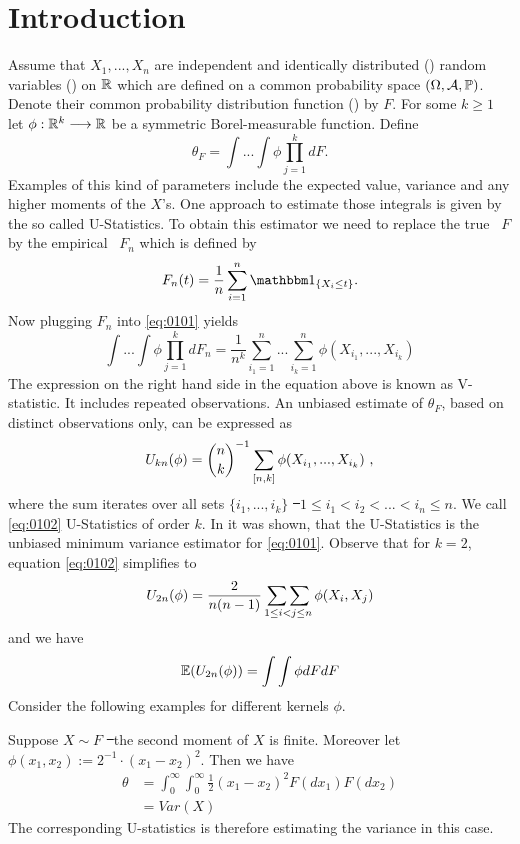 \chapter{Introduction} \label{ch:introduction}
\label{sec:introduction}

Assume that $X_1,...,X_n$ are independent and identically distributed (\iid) random variables (\rv) on $\mathbb{R}$ which are defined on a common probability space $(\Omega, \mathcal{A}, \mathbb{P})$. Denote their common probability distribution function (\df) by $F$. For some $k\geq 1$ let $\phi: \mathbb{R}^k \longrightarrow \mathbb{R}$ be a symmetric Borel-measurable function. Define
\begin{equation}
\theta_F = \int ... \int \phi \prod\limits_{j=1}^k dF. 
\label{eq:0101}
\end{equation}
Examples of this kind of parameters include the expected value, variance and any higher moments of the $X$'s. One approach to estimate those integrals is given by the so called U-Statistics. To obtain this estimator we need to replace the true \df\ $F$ by the empirical \df\ $F_n$ which is defined by
$$F_n(t) = \frac{1}{n}\sum\limits_{i=1}^n \I{X_i\leq t}.$$
Now plugging $F_n$ into \eqref{eq:0101} yields
$$\int ... \int \phi \prod\limits_{j=1}^k dF_n = \frac{1}{n^k}\sum\limits_{i_1=1}^n...\sum\limits_{i_k=1}^n \phi(X_{i_1},...,X_{i_k})$$
The expression on the right hand side in the equation above is known as V-statistic. It includes repeated observations. An unbiased estimate of $\theta_F$, based on distinct observations only, can be expressed as
\begin{equation}
U_{kn}(\phi) = {n \choose k}^{-1} \sum\limits_{[n,k]} \phi(X_{i_1},...,X_{i_k})\textrm{ ,}
\label{eq:0102}
\end{equation}
where the sum iterates over all sets $\{i_1,...,i_k\}$ \st\ $ 1\leq i_1 < i_2 < ... < i_n \leq n$. We call \eqref{eq:0102} U-Statistics of order $k$. In \cite{lee1990u} it was shown, that the U-Statistics is the unbiased minimum variance estimator for \eqref{eq:0101}. Observe that for $k=2$, equation \eqref{eq:0102} simplifies to
$$U_{2n}(\phi)=\frac{2}{n(n-1)}\mathop{\sum\sum}\limits_{1\leq i<j \leq n}\phi(X_i,X_j)$$
and we have
$$\mathbb{E}(U_{2n}(\phi))=\int \int \phi dF dF$$
%
Consider the following examples for different kernels $\phi$.
\begin{example} \label{ex:phi}
	Suppose $X\sim F$ \st\ the second moment of $X$ is finite. Moreover let $\phi(x_1, x_2) := 2^{-1} \cdot (x_1 - x_2)^2$. Then we have
	\begin{align*}
	\theta &= \int_{0}^{\infty} \int_{0}^{\infty} \frac{1}{2} (x_1 - x_2)^2 F(dx_1)F(dx_2)\\
	&= Var(X)
	\end{align*}
	The corresponding U-statistics is therefore estimating the variance in this case.
\end{example}
